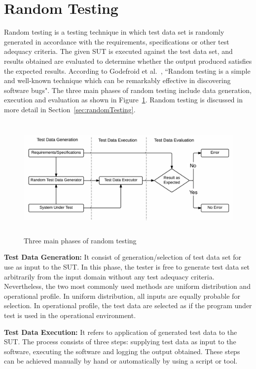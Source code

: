  

\section{Random Testing} \label{sec:RT_1}
Random testing is a testing technique in which test data set is randomly generated in accordance with the requirements, specifications or other test adequacy criteria. The given SUT is executed against the test data set, and results obtained are evaluated to determine whether the output produced satisfies the expected results. According to Godefroid et al.~\cite{godefroid2005dart}, ``Random testing is a simple and well-known technique which can be remarkably effective in discovering software bugs". The three main phases of random testing include data generation, execution and evaluation as shown in Figure~\ref{fig:SoftwareTesting1}. Random testing is discussed in more detail in Section~\ref{sec:randomTesting}.
\bigskip
\begin{figure}[H]
	\centering
		\includegraphics[width=15cm, height=6cm ]{chapter1/randomTestingPhases1.png}
		\caption{Three main phases of random testing}
	\label{fig:SoftwareTesting1}
\end{figure}

\textbf{Test Data Generation:} It consist of generation/selection of test data set for use as input to the SUT. In this phase, the tester is free to generate test data set arbitrarily from the input domain without any test adequacy criteria. Nevertheless, the two most commonly used methods are uniform distribution and operational profile. In uniform distribution, all inputs are equally probable for selection. In operational profile, the test data are selected as if the program under test is used in the operational environment.

\textbf{Test Data Execution:} It refers to application of generated test data to the SUT. The process consists of three steps: supplying test data as input to the software, executing the software and logging the output obtained. 
These steps can be achieved manually by hand or automatically by using a script or tool. 

